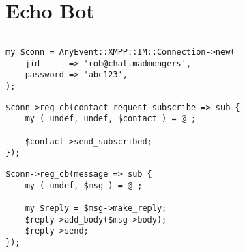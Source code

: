 \section*{Echo Bot}

\begin{shaded}
\inputminted{perl}{examples/echo-bot.pl}
\end{shaded}
\pause

\begin{shaded}
\begin{verbatim}
my $conn = AnyEvent::XMPP::IM::Connection->new(
    jid      => 'rob@chat.madmongers',
    password => 'abc123',
);
\end{verbatim}
\end{shaded}
\pause

\begin{shaded}
\begin{verbatim}
$conn->reg_cb(contact_request_subscribe => sub {
    my ( undef, undef, $contact ) = @_;

    $contact->send_subscribed;
});
\end{verbatim}
\end{shaded}

\newpage

\begin{shaded}
\begin{verbatim}
$conn->reg_cb(message => sub {
    my ( undef, $msg ) = @_;

    my $reply = $msg->make_reply;
    $reply->add_body($msg->body);
    $reply->send;
});
\end{verbatim}
\end{shaded}
\pause
